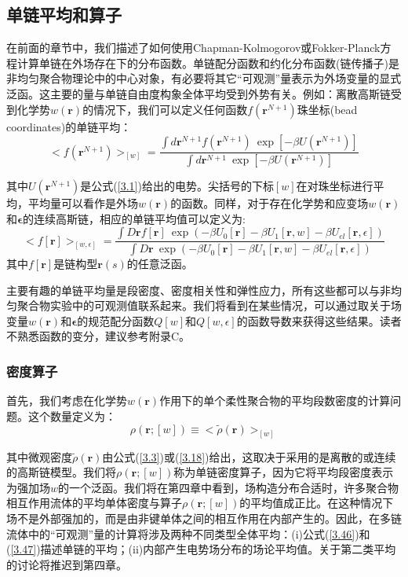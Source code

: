 \subsection{单链平均和算子}
在前面的章节中，我们描述了如何使用Chapman-Kolmogorov或Fokker-Planck方程计算单链在外场存在下的分布函数。单链配分函数和约化分布函数(链传播子)是非均匀聚合物理论中的中心对象，有必要将其它“可观测”量表示为外场变量的显式泛函。这主要的量与单链自由度构象全体平均受到外势有关。例如：离散高斯链受到化学势$w (\mathbf{r})$的情况下，我们可以定义任何函数$f(\mathbf{r}^{N+1})$珠坐标(bead coordinates)的单链平均：
\begin{equation}\label{3.46}
<f(\mathbf{r}^{N+1})>_{[w]}= \frac{\int d \mathbf{r}^{N+1} f(\mathbf{r}^{N+1})~\exp[-\beta U(\mathbf{r}^{N+1})]}{\int d\mathbf{r}^{N+1}~\exp[-\beta U(\mathbf{r}^{N+1})]}
\end{equation}

其中$U(\mathbf{r}^{N+1})$是公式(\ref{3.1})给出的电势。尖括号的下标$[w]$在对珠坐标进行平均，平均量可以看作是外场$w(\mathbf{r})$的函数。同样，对于存在化学势和应变场$w(\mathbf{r})$和$\mathbf{\epsilon}$的连续高斯链，相应的单链平均值可以定义为:
\begin{equation}\label{3.47}
<f[\mathbf{r}]>_{[w ,\epsilon]}=\frac{\int D\mathbf{r}f[\mathbf{r}]~\exp(-\beta U_{0}[\mathbf{r}]-\beta U_{1}[\mathbf{r},w]-\beta U_{el}[\mathbf{r},\epsilon])}{\int D\mathbf{r}~\exp(-\beta U_{0}[\mathbf{r}]-\beta U_{1}[\mathbf{r},w]-\beta U_{el}[\mathbf{r},\epsilon])}
\end{equation}
其中$f[\mathbf{r}]$是链构型$\mathbf{r}(s)$的任意泛函。

主要有趣的单链平均量是段密度、密度相关性和弹性应力，所有这些都可以与非均匀聚合物实验中的可观测值联系起来。我们将看到在某些情况，可以通过取关于场变量$w(\mathbf{r})$和$\mathbf{\epsilon}$的规范配分函数$Q[w]$和$Q[w,\epsilon]$的函数导数来获得这些结果。读者不熟悉函数的变分，建议参考附录C。
\subsubsection{密度算子}
首先，我们考虑在化学势$w(\mathbf{r})$作用下的单个柔性聚合物的平均段数密度的计算问题。这个数量定义为：
\begin{equation}\label{3.48}
\rho(\mathbf{r};[w])\equiv<\tilde{\rho}(\mathbf{r})>_{[w]}
\end{equation}

其中微观密度$\tilde{\rho}(\mathbf{r})$由公式(\ref{3.3})或(\ref{3.18})给出，这取决于采用的是离散的或连续的高斯链模型。我们将$\rho(\mathbf{r};[w])$称为单链密度算子，因为它将平均段密度表示为强加场$w$的一个泛函。我们将在第四章中看到，场构造分布合适时，许多聚合物相互作用流体的平均单体密度与算子$\rho(\mathbf{r};[w])$的平均值成正比。在这种情况下场不是外部强加的，而是由非键单体之间的相互作用在内部产生的。因此，在多链流体中的“可观测”量的计算将涉及两种不同类型全体平均：(i)公式(\ref{3.46})和(\ref{3.47})描述单链的平均；(ii)内部产生电势场分布的场论平均值。关于第二类平均的讨论将推迟到第四章。

